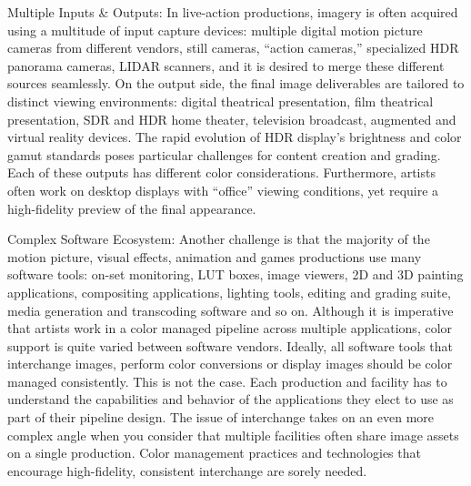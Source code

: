 Multiple Inputs & Outputs: In live-action productions, imagery is often acquired using a multitude of input capture devices: multiple digital motion picture cameras from different vendors, still cameras, “action cameras,” specialized HDR panorama cameras, LIDAR scanners, and it is desired to merge these different sources seamlessly. On the output side, the final image deliverables are tailored to distinct viewing environments: digital theatrical presentation, film theatrical presentation, SDR and HDR home theater, television broadcast, augmented and virtual reality devices. The rapid evolution of HDR display’s brightness and color gamut standards poses particular challenges for content creation and grading. Each of these outputs has different color considerations. Furthermore, artists often work on desktop displays with “office” viewing conditions, yet require a high-fidelity preview of the final appearance.

Complex Software Ecosystem: Another challenge is that the majority of the motion picture, visual effects, animation and games productions use many software tools: on-set monitoring, LUT boxes, image viewers, 2D and 3D painting applications, compositing applications, lighting tools, editing and grading suite, media generation and transcoding software  and so on. Although it is imperative that artists work in a color managed pipeline across multiple applications, color support is quite varied between software vendors. Ideally, all software tools that interchange images, perform color conversions or display images should be color managed consistently. This is not the case. Each production and facility has to understand the capabilities and behavior of the applications they elect to use as part of their pipeline design. The issue of interchange takes on an even more complex angle when you consider that multiple facilities often share image assets on a single production. Color management practices and technologies that encourage high-fidelity, consistent interchange are sorely needed.

